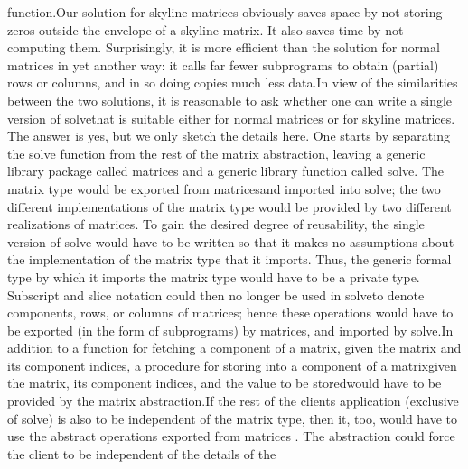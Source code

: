 \tyxffmxendmono[] function.\Endpara[]
\Para[]Our solution for skyline matrices obviously saves space by
not storing zeros outside the envelope of a skyline matrix. It also
saves time by not computing them. Surprisingly, it is more efficient
than the solution for normal matrices in yet another way: it calls
far fewer subprograms to obtain (partial) rows or columns, and in
so doing copies much less data.\Endpara[]
\Para[]In view of the similarities between the two solutions, it is
reasonable to ask whether one can write a single version of %
\tyxffmxmono[]solve\tyxffmxendmono[] that is suitable either for normal
matrices or for skyline matrices. The answer is yes, but we only sketch
the details here. One starts by separating the \tyxffmxmono[]solve%
\tyxffmxendmono[] function from the rest of the matrix abstraction,
leaving a generic library package called \tyxffmxmono[]matrices%
\tyxffmxendmono[] and a generic library function called %
\tyxffmxmono[]solve\tyxffmxendmono[]. The matrix type would be exported
from \tyxffmxmono[]matrices\tyxffmxendmono[] and imported into %
\tyxffmxmono[]solve\tyxffmxendmono[]; the two different implementations
of the matrix type would be provided by two different realizations
of \tyxffmxmono[]matrices\tyxffmxendmono[]. To gain the desired degree
of reusability, the single version of \tyxffmxmono[]solve%
\tyxffmxendmono[] would have to be written so that it makes no assumptions
about the implementation of the matrix type that it imports. Thus,
the generic formal type by which it imports the matrix type would
have to be a private type. Subscript and slice notation could then
no longer be used in \tyxffmxmono[]solve\tyxffmxendmono[] to denote
components, rows, or columns of matrices; hence these operations would
have to be exported (in the form of subprograms) by %
\tyxffmxmono[]matrices\tyxffmxendmono[], and imported by %
\tyxffmxmono[]solve\tyxffmxendmono[].\NtFoot[]\NtNtpar[]In addition
to a function for fetching a component of a matrix, given the matrix
and its component indices, a procedure for storing into a component
of a matrix\EmDash[]given the matrix, its component indices, and the
value to be stored\EmDash[]would have to be provided by the matrix
abstraction.\NtEndntpar[]\NtEndfoot[] If the rest of the client\rsquo[]s
application (exclusive of \tyxffmxmono[]solve\tyxffmxendmono[]) is
also to be independent of the matrix type, then it, too, would have
to use the abstract operations exported from \tyxffmxmono[]matrices%
\tyxffmxendmono[]. The abstraction could \txtxemph[]force%
\txtxendemph[] the client to be independent of the details of the
